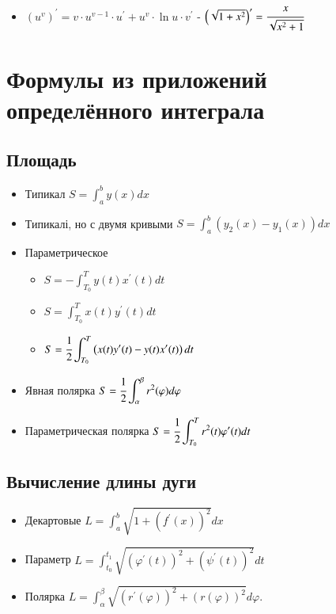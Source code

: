 \documentclass[twoside, a4paperpt]{extarticle}
\begin{document}
\begin{itemize}
    \item $\left(u^{v}\right)^{\prime}=v \cdot u^{v-1} \cdot u^{\prime}+u^{v} \cdot \ln u \cdot v^{\prime}$ - $\left(\sqrt{1+x^{2}}\right)^{\prime}=\cfrac{x}{\sqrt{x^{2}+1}}$
\end{itemize}

\section*{Формулы из приложений определённого интеграла}

\subsection*{Площадь}
\begin{itemize}

    \item  Типикал $S=\displaystyle \int_{a}^{b} y(x) d x$

    \item  Типикалі, но с двумя кривыми $S=\displaystyle \int_{a}^{b}\left(y_{2}(x)-y_{1}(x)\right) d x$

    \item  Параметрическое

    \begin{itemize}
        \item $ S=-\displaystyle \int_{T_{0}}^{T} y(t) x^{\prime}(t) d t $

        \item $ S=\displaystyle \int_{T_{0}}^{T} x(t) y^{\prime}(t) d t  $
    
        \item $ S=\cfrac{1}{2} \displaystyle \int_{T_{0}}^{T}\left(x(t) y^{\prime}(t)-y(t) x^{\prime}(t)\right) d t $
    \end{itemize}



    \item  Явная полярка $S=\cfrac{1}{2} \displaystyle \int_{\alpha}^{\beta} r^{2}(\varphi) d \varphi$

    \item  Параметрическая полярка $S=\cfrac{1}{2} \displaystyle \int_{T_{0}}^{T} r^{2}(t) \varphi^{\prime}(t) d t$
\end{itemize}
\subsection*{Вычисление длины дуги}
\begin{itemize}
    \item  Декартовые $L=\displaystyle \int_{a}^{b} \sqrt{1+\left(f^{\prime}(x)\right)^{2}} d x$
    \item  Параметр $L=\displaystyle \int_{t_{0}}^{t_{1}} \sqrt{\left(\varphi^{\prime}(t)\right)^{2}+\left(\psi^{\prime}(t)\right)^{2}} d t$
    \item  Полярка $L=\displaystyle \int_{\alpha}^{\beta} \sqrt{\left(r^{\prime}(\varphi)\right)^{2}+(r(\varphi))^{2}} d \varphi .$
\end{itemize}
\end{document}
